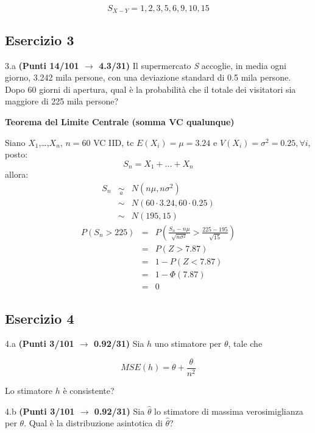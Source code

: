 \documentclass[
  11pt,
]{book}
\theoremstyle{mytheoremstyle}
\theoremstyle{mydefstyle}
\newenvironment{sol}
  {
  \begin{tcolorbox}[enhanced,breakable,arc=0.1mm,boxrule=1pt,colback=white,colframe=iblue,
  title=\bf \fontfamily{lmss}\selectfont \hspace{.5 cm} Soluzione,drop fuzzy shadow]

}{
\end{tcolorbox}
  }
\begin{document}
\begin{sol}
\[S_{X-Y}=1, 2, 3, 5, 6, 9, 10, 15\]

\end{sol}

\subsection{Esercizio 3}\label{esercizio-3-18}

3.a \textbf{(Punti 14/101 \(\rightarrow\) 4.3/31)} Il supermercato \emph{S} accoglie, in media ogni giorno, 3.242 mila persone, con una
deviazione standard di 0.5 mila persone. Dopo 60 giorni di apertura, qual è la probabilità che il
totale dei visitatori sia maggiore di 225 mila persone?

\textbf{Teorema del Limite Centrale (somma VC qualunque)}

Siano \(X_1\),\ldots,\(X_n\), \(n=60\) VC IID, tc \(E(X_i)=\mu=3.24\) e \(V(X_i)=\sigma^2=0.25,\forall i\), posto:
\[
      S_n = X_1 + ... + X_n
      \]
allora:\begin{eqnarray*}
  S_n & \mathop{\sim}\limits_{a}& N(n\mu,n\sigma^2) \\
     &\sim & N(60\cdot3.24,60\cdot0.25) \\
     &\sim & N(195,15) 
  \end{eqnarray*}\begin{eqnarray*}
      P( S_n   >   225 ) 
        &=& P\left(  \frac { S_n  -  n\mu }{ \sqrt{n\sigma^2} }  >  \frac { 225  -  195 }{\sqrt{ 15 }} \right)  \\
                 &=& P\left(  Z   >   7.87 \right) \\    &=& 1-P(Z< 7.87 )\\ 
                 &=&  1-\Phi( 7.87 ) \\ &=&  0 
      \end{eqnarray*}

\subsection{Esercizio 4}\label{esercizio-4-18}

4.a \textbf{(Punti 3/101 \(\rightarrow\) 0.92/31)} Sia \(h\) uno stimatore per \(\theta\), tale che

\[
MSE(h) =  \theta+\frac{\theta}{n^2}
\]

Lo stimatore \(h\) è consistente?

4.b \textbf{(Punti 3/101 \(\rightarrow\) 0.92/31)} Sia \(\hat\theta\) lo stimatore di massima verosimiglianza
per \(\theta\). Qual è la distribuzione asintotica di \(\hat\theta\)?
\end{document}
